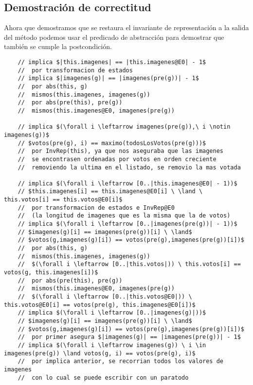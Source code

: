 \documentclass[10pt,a4paper,spanish]{article}
\begin{document}
\newpage

\subsection{Demostración de correctitud}

\begin{paragraph}{}
Ahora que demostramos que se restaura el invariante de representación a la
salida del método podemos usar el predicado de abstracción para demostrar que
también se cumple la postcondición.
\end{paragraph}

\begin{lstlisting}
	// implica $|this.imagenes| == |this.imagenes@E0| - 1$
	// 	por transformacion de estados
	// implica $|imagenes(g)| == |imagenes(pre(g))| - 1$
	//	por abs(this, g)
	//	mismos(this.imagenes, imagenes(g))
	//	por abs(pre(this), pre(g))
	//	mismos(this.imagenes@E0, imagenes(pre(g))

	// implica $(\forall i \leftarrow imagenes(pre(g)),\ i \notin imagenes(g))$
	// $votos(pre(g), i) == maximo(todosLosVotos(pre(g)))$
	//	por InvRep(this), ya que nos aseguraba que las imagenes
	//	se encontrasen ordenadas por votos en orden creciente
	//	removiendo la ultima en el listado, se removio la mas votada

	// implica $(\forall i \leftarrow [0..|this.imagenes@E0| - 1))$
	// $this.imagenes[i] == this.imagenes@E0[i] \ \land \ this.votos[i] == this.votos@E0[i]$
	//	por transformacion de estados e InvRep@E0
	//	(la longitud de imagenes que es la misma que la de votos)
	// implica $(\forall i \leftarrow [0..|imagenes(pre(g))| - 1))$
	// $imagenes(g)[i] == imagenes(pre(g))[i] \ \land$
	// $votos(g,imagenes(g)[i]) == votos(pre(g),imagenes(pre(g))[i])$
	//	por abs(this, g)
	//	mismos(this.imagenes, imagenes(g))
	// 	$(\forall i \leftarrow [0..|this.votos|)) \ this.votos[i] == votos(g, this.imagenes[i])$
	//	por abs(pre(this), pre(g))
	//	mismos(this.imagenes@E0, imagenes(pre(g))
	// 	$(\forall i \leftarrow [0..|this.votos@E0|)) \ this.votos@E0[i] == votos(pre(g), this.imagenes@E0[i])$
	// implica $(\forall i \leftarrow [0..|imagenes(g)|))$
	// $imagenes(g)[i] == imagenes(pre(g))[i] \ \land$
	// $votos(g,imagenes(g)[i]) == votos(pre(g),imagenes(pre(g))[i])$
	//	por primer asegura $|imagenes(g)| == |imagenes(pre(g))| - 1$
	// implica $(\forall i \leftarrow imagenes(g)) \ i \in imagenes(pre(g)) \land votos(g, i) == votos(pre(g), i)$
	//	por implica anterior, se recorrian todos los valores de imagenes
	//	con lo cual se puede escribir con un paratodo
\end{lstlisting}
\end{document}
